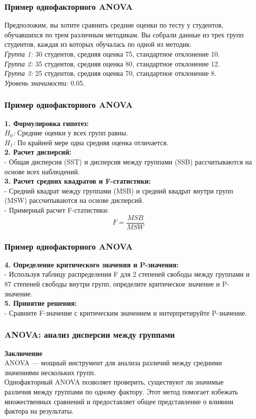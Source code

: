 \documentclass[aspectratio=169]{beamer}
\begin{document}
\begin{frame}
\frametitle{Пример однофакторного ANOVA}
Предположим, вы хотите сравнить средние оценки по тесту у студентов, обучавшихся по трем различным методикам. Вы собрали данные из трех групп студентов, каждая из которых обучалась по одной из методик:\\
{\it Группа 1:} 30 студентов, средняя оценка 75, стандартное отклонение 10.\\
{\it Группа 2:} 35 студентов, средняя оценка 80, стандартное отклонение 12.\\
{\it Группа 3:} 25 студентов, средняя оценка 70, стандартное отклонение 8.\\
{\it Уровень значимости:} 0.05.
\end{frame}

\begin{frame}
\frametitle{Пример однофакторного ANOVA}
{\bf 1. Формулировка гипотез:}\\
{\it $H_0$:} Средние оценки у всех групп равны.\\
{\it $H_1$:} По крайней мере одна средняя оценка отличается.\\
{\bf 2. Расчет дисперсий:}\\
- Общая дисперсия (SST) и дисперсия между группами (SSB) рассчитываются на основе всех наблюдений.\\
{\bf 3. Расчет средних квадратов и F-статистики:}\\
- Средний квадрат между группами (MSB) и средний квадрат внутри групп (MSW) рассчитываются на основе дисперсий.\\
- Примерный расчет F-статистики:
     \[
     F = \frac{MSB}{MSW}
     \]
\end{frame}

\begin{frame}
\frametitle{Пример однофакторного ANOVA}
{\bf 4. Определение критического значения и P-значения:}\\
- Используя таблицу распределения F для 2 степеней свободы между группами и 87 степеней свободы внутри групп, определите критическое значение и P-значение.\\
{\bf 5. Принятие решения:}\\
- Сравните F-значение с критическим значением и интерпретируйте P-значение.
\end{frame}

\begin{frame}
\frametitle{ANOVA: анализ дисперсии между группами}
{\bf Заключение}\\
ANOVA — мощный инструмент для анализа различий между средними значениями нескольких групп.\\
Однофакторный ANOVA позволяет проверить, существуют ли значимые различия между группами по одному фактору. Этот метод помогает избежать множественных сравнений и предоставляет общее представление о влиянии фактора на результаты.
\end{frame}
\end{document}
